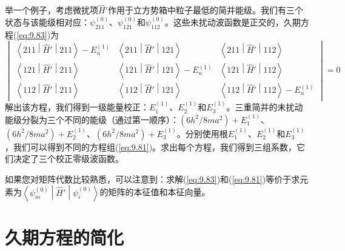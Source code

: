     举一个例子，考虑微扰项$\hat{H}'$作用于立方势箱中粒子最低的简并能级。我们有三个状态与该能级相对应：$\psi_{211}^{\left(0\right)}$、$\psi_{121}^{\left(0\right)}$和$\psi_{112}^{\left(0\right)}$。这些未扰动波函数是正交的，久期方程(\ref{eq:9.83})为
    \begin{equation}
        \begin{vmatrix}
            \left\langle 211 \middle| \hat{H}' \middle| 211 \right\rangle - E_n^{\left(1\right)} & \left\langle 211 \middle| \hat{H}' \middle| 121 \right\rangle & \left\langle 211 \middle| \hat{H}' \middle| 112 \right\rangle \\
            \left\langle 121 \middle| \hat{H}' \middle| 211 \right\rangle & \left\langle 121 \middle| \hat{H}' \middle| 121 \right\rangle - E_n^{\left(1\right)} & \left\langle 121 \middle| \hat{H}' \middle| 112 \right\rangle \\
            \left\langle 112 \middle| \hat{H}' \middle| 211 \right\rangle & \left\langle 112 \middle| \hat{H}' \middle| 121 \right\rangle & \left\langle 112 \middle| \hat{H}' \middle| 112 \right\rangle - E_n^{\left(1\right)}
        \end{vmatrix} = 0
        \label{eq:9.87}
    \end{equation}
    解出该方程，我们得到一级能量校正：$E_1^{\left(1\right)}$、$E_2^{\left(1\right)}$和$E_3^{\left(1\right)}$。三重简并的未扰动能级分裂为三个不同的能级（通过第一顺序）：$\left(6h^2/8ma^2\right) + E_1^{\left(1\right)}$、$\left(6h^2/8ma^2\right) + E_2^{\left(1\right)}$、$\left(6h^2/8ma^2\right) + E_3^{\left(1\right)}$。分别使用根$E_1^{\left(1\right)}$、$E_2^{\left(1\right)}$和$E_3^{\left(1\right)}$，我们可以得到不同的方程组(\ref{eq:9.81})。求出每个方程，我们得到三组系数，它们决定了三个校正零级波函数。

    如果您对矩阵代数比较熟悉，可以注意到：求解(\ref{eq:9.83})和(\ref{eq:9.81})等价于求元素为$\left\langle \psi_m^{\left(0\right)} \middle| \hat{H}' \middle| \psi_i^{\left(0\right)} \right\rangle$的矩阵的本征值和本征向量。

\section{久期方程的简化}
\label{sec:9.6 Simplification of the Duration Equation}

